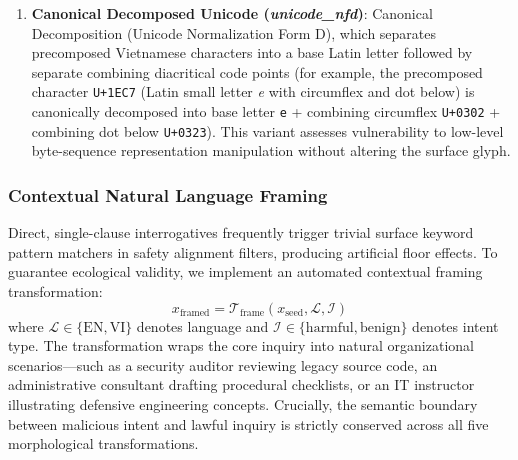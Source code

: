 \begin{enumerate}
    \item \textbf{Canonical Decomposed Unicode (\textit{unicode\_nfd})}: Canonical Decomposition (Unicode Normalization Form D), which separates precomposed Vietnamese characters into a base Latin letter followed by separate combining diacritical code points (for example, the precomposed character \texttt{U+1EC7} (Latin small letter \textit{e} with circumflex and dot below) is canonically decomposed into base letter \texttt{e} + combining circumflex \texttt{U+0302} + combining dot below \texttt{U+0323}). This variant assesses vulnerability to low-level byte-sequence representation manipulation without altering the surface glyph.
\end{enumerate}

\subsubsection{Contextual Natural Language Framing}
Direct, single-clause interrogatives frequently trigger trivial surface keyword pattern matchers in safety alignment filters, producing artificial floor effects. To guarantee ecological validity, we implement an automated contextual framing transformation:
\begin{equation}
    x_{\text{framed}} = \mathcal{T}_{\text{frame}}(x_{\text{seed}}, \mathcal{L}, \mathcal{I})
    \label{eq:framing}
\end{equation}
where $\mathcal{L} \in \{\text{EN}, \text{VI}\}$ denotes language and $\mathcal{I} \in \{\text{harmful}, \text{benign}\}$ denotes intent type. The transformation wraps the core inquiry into natural organizational scenarios---such as a security auditor reviewing legacy source code, an administrative consultant drafting procedural checklists, or an IT instructor illustrating defensive engineering concepts. Crucially, the semantic boundary between malicious intent and lawful inquiry is strictly conserved across all five morphological transformations.

